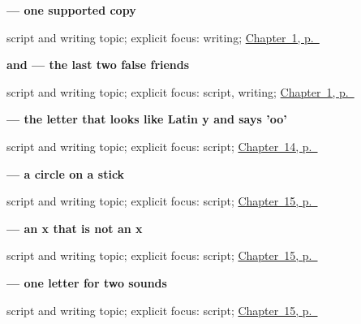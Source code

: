 \noindent\begin{minipage}[t]{\linewidth}
\raggedright
\textbf{ — one supported copy}\par
\footnotesize script and writing topic; explicit focus: writing; \hyperref[ch:russian-greetings]{Chapter~1, p.~\pageref*{ch:russian-greetings}}
\end{minipage}\par\smallskip

\noindent\begin{minipage}[t]{\linewidth}
\raggedright
\textbf{ and  — the last two false friends}\par
\footnotesize script and writing topic; explicit focus: script, writing; \hyperref[ch:russian-greetings]{Chapter~1, p.~\pageref*{ch:russian-greetings}}
\end{minipage}\par\smallskip

\noindent\begin{minipage}[t]{\linewidth}
\raggedright
\textbf{ — the letter that looks like Latin y and says 'oo'}\par
\footnotesize script and writing topic; explicit focus: script; \hyperref[ch:ru-script-eleven]{Chapter~14, p.~\pageref*{ch:ru-script-eleven}}
\end{minipage}\par\smallskip

\noindent\begin{minipage}[t]{\linewidth}
\raggedright
\textbf{ — a circle on a stick}\par
\footnotesize script and writing topic; explicit focus: script; \hyperref[ch:ru-script-eight]{Chapter~15, p.~\pageref*{ch:ru-script-eight}}
\end{minipage}\par\smallskip

\noindent\begin{minipage}[t]{\linewidth}
\raggedright
\textbf{ — an x that is not an x}\par
\footnotesize script and writing topic; explicit focus: script; \hyperref[ch:ru-script-eight]{Chapter~15, p.~\pageref*{ch:ru-script-eight}}
\end{minipage}\par\smallskip

\noindent\begin{minipage}[t]{\linewidth}
\raggedright
\textbf{ — one letter for two sounds}\par
\footnotesize script and writing topic; explicit focus: script; \hyperref[ch:ru-script-eight]{Chapter~15, p.~\pageref*{ch:ru-script-eight}}
\end{minipage}\par\smallskip

